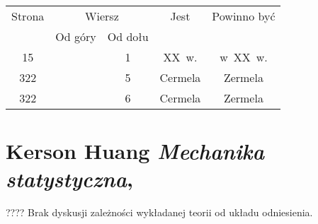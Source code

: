 \documentclass[a4paper,11pt]{article}
\numberwithin{equation}{section}
\begin{document}
\VerSpaceFour








\noindent



\begin{center}

  \begin{tabular}{|c|c|c|c|c|}
    \hline
    Strona & \multicolumn{2}{c|}{Wiersz} & Jest
                              & Powinno być \\ \cline{2-3}
    & Od góry & Od dołu & & \\
    \hline
    15 & & \hphantom{0}1 & XX~w. & w~XX~w. \\
    322 & & \hphantom{0}5 & Cermela & Zermela \\
    322 & & \hphantom{0}6 & Cermela & Zermela \\
    \hline
  \end{tabular}

\end{center}

\VerSpaceTwo












\section{Kerson Huang \textit{Mechanika statystyczna},
  \cite{HuangMechanikaStatystyczna1987}}


\vspace{0em}



\vspace{0em}


\noindent
???? Brak dyskusji zależności wykładanej teorii od układu odniesienia.
\end{document}
